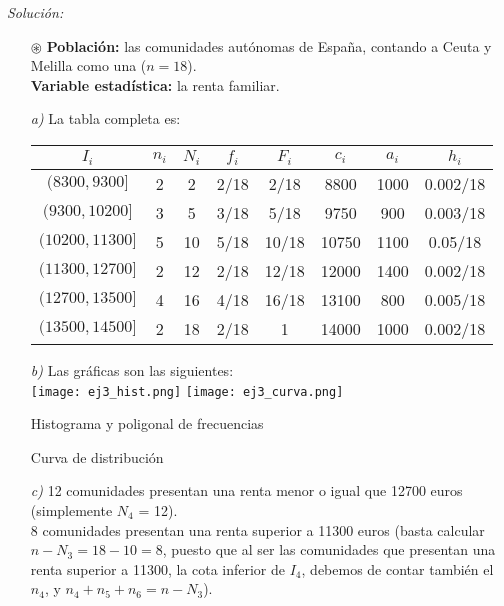 \documentclass[11pt,a4paper]{article}
\theoremstyle{definition}
\begin{document}
{\color{grey}\hrulefill}

\emph{Solución:}

\begin{itemize}
	\item[$\circledast$] \textbf{Población:} las comunidades autónomas de España, contando a Ceuta y Melilla como una ($n=18$). \\ \textbf{Variable estadística:} la renta familiar.
	\item[\emph{a)}] La tabla completa es:

\begin{table}[!htbp]
\hspace{2cm}
\begin{tabular}{|c|c|c|c|c|c|c|c|}
\multicolumn{1}{c|}{$I_i$} & $n_i$ & $N_i$ & $f_i$ & $F_i$ & $c_i$ & $a_i$ & $h_i$ \\ \hline
$(8300, 9300]$ & 2	& 	2	& 2/18 & 2/18 & 8800 & 	1000	&  0.002/18\\
$(9300, 10200]$ & 3 & 5		& 3/18 & 5/18 & 9750 & 	900	& 0.003/18 \\
$(10200, 11300]$ & 5 & 	10	& 5/18 & 10/18	& 10750 & 1100	& 0.05/18  \\
$(11300, 12700]$ & 2 & 	12	& 2/18	& 12/18 & 12000	& 	1400	& 0.002/18 \\
$(12700, 13500]$ & 4	& 16	& 	4/18	& 	16/18	& 13100		& 	800	& 0.005/18 \\
$(13500, 14500]$ & 2	& 18	&	2/18	& 1		& 	14000	& 	1000	& 0.002/18 \\ \hline
\end{tabular}
\end{table}
	\item[\emph{b)}] Las gráficas son las siguientes: \\

\hspace{0.5cm} \texttt{[image: ej3\_hist.png]} \hspace{0.5cm} \texttt{[image: ej3\_curva.png]}

\begin{multicols}{2}
\begin{center}
\small{Histograma y poligonal de frecuencias} \\
\end{center}
\begin{center}
\small{Curva de distribución}
\end{center}
\end{multicols}
	\item[\emph{c)}] 12 comunidades presentan una renta menor o igual que 12700 euros (simplemente $N_4$ = 12). \\
	8 comunidades presentan una renta superior a 11300 euros (basta calcular $n-N_3=18-10=8$, puesto que al ser las comunidades que presentan una renta superior a 11300, la cota inferior de $I_4$, debemos de contar también el $n_4$, y $n_4 + n_5 + n_6 = n - N_3$).

\end{itemize}
\end{document}
